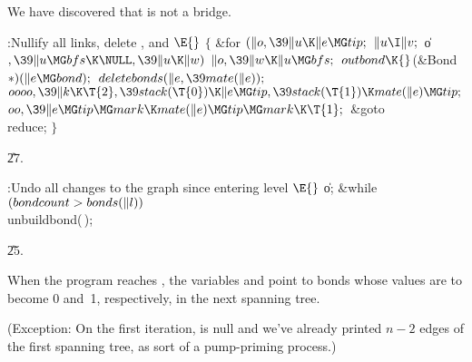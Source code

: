 We have discovered that  is not a bridge.

\Y\B\4:Nullify all  links, delete , and \X${}\E{}$\6
${}\{{}$\1\6
\&{for} ${}(\|o,\39\|u\K\|e\MG\\{tip};{}$ ${}\|u\I\|v;{}$ \|o${},\39\|u\MG%
\\{bfs}\K\NULL,\39\|u\K\|w){}$\1\5
${}\|o,\39\|w\K\|u\MG\\{bfs};{}$\2\6
${}\\{outbond}\K{}$(\&{Bond} ${}{*})(\|e\MG\\{bond});{}$\6
${}\\{deletebonds}(\|e,\39\\{mate}(\|e));{}$\6
${}\\{oooo},\39\|k\K\T{2},\39\\{stack}(\T{0})\K\|e\MG\\{tip},\39\\{stack}(%
\T{1})\K\\{mate}(\|e)\MG\\{tip};{}$\6
${}\\{oo},\39\|e\MG\\{tip}\MG\\{mark}\K\\{mate}(\|e)\MG\\{tip}\MG\\{mark}\K%
\T{1};{}$\6
\&{goto} \\{reduce};\6
\4${}\}{}$\2\par
\U27.\fi

\B{}:Undo all changes to the graph since entering
level \X${}\E{}$\6
\|o;\5
\&{while} ${}(\\{bondcount}>\\{bonds}(\|l)){}$\1\5
\\{unbuildbond}(\,);\2\par
\U25.\fi

When the program reaches , the
variables 
and  point to bonds whose values are to become 0 and~1,
respectively, in the next spanning tree.

(Exception: On the first
iteration,  is null and we've already printed $n-2$ edges
of the first spanning tree, as sort of a pump-priming process.)

